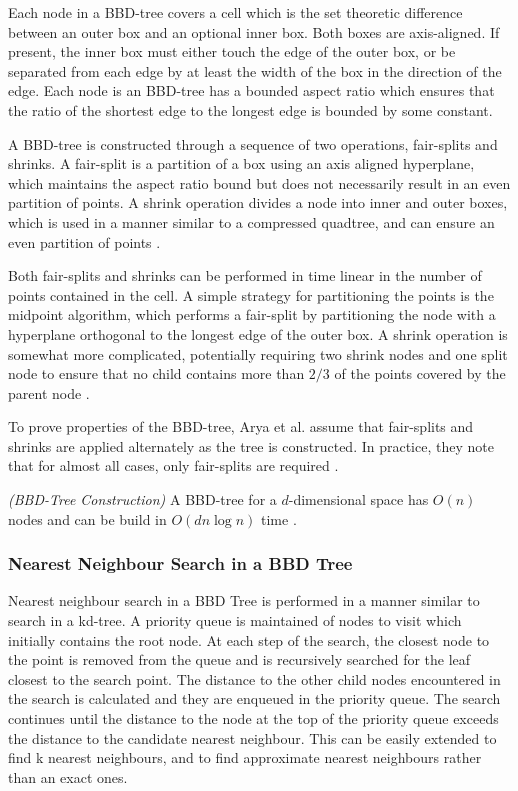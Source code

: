 \documentclass[mcs]{scsthesis}
\begin{document}
Each node in a BBD-tree covers a cell which is the set theoretic difference
between an outer box and an optional inner box. Both boxes are axis-aligned.
If present, the inner box must either touch the edge of the outer box, or be
separated from each edge by at least the width of the box in the direction of
the edge. Each node is an BBD-tree has a bounded aspect ratio which ensures
that the ratio of the shortest edge to the longest edge is bounded by some
constant.

A BBD-tree is constructed through a sequence of two operations, fair-splits
and shrinks. A fair-split is a partition of a box using an axis aligned
hyperplane, which maintains the aspect ratio bound but does not necessarily
result in an even partition of points. A shrink operation divides a node into
inner and outer boxes, which is used in a manner similar to a compressed
quadtree, and can ensure an even partition of points \cite{optimalann}.

Both fair-splits and shrinks can be performed in time linear in the number of
points contained in the cell. A simple strategy for partitioning the points is
the midpoint algorithm, which performs a fair-split by partitioning the node
with a hyperplane orthogonal to the longest edge of the outer box. A shrink
operation is somewhat more complicated, potentially requiring two shrink nodes
and one split node to ensure that no child contains more than \(2/3\) of the
points covered by the parent node \cite{optimalann}.

To prove properties of the BBD-tree, Arya et al. assume that fair-splits and
shrinks are applied alternately as the tree is constructed. In practice, they
note that for almost all cases, only fair-splits are required \cite{optimalann}. 

\begin{thm} \emph{(BBD-Tree Construction)} 
A BBD-tree for a \(d\)-dimensional space has \(O(n)\) nodes and can be build in
\(O(d n \log n)\) time \cite{optimalann}.
\end{thm}

\subsubsection{Nearest Neighbour Search in a BBD Tree}

Nearest neighbour search in a BBD Tree is performed in a manner similar to
search in a kd-tree. A priority queue is maintained of nodes to visit which
initially contains the root node. At each step of the search, the closest
node to the point is removed from the queue and is recursively searched for
the leaf closest to the search point. The distance to the other child nodes
encountered in the search is calculated and they are enqueued in the priority
queue. The search continues until the distance to the node at the top of the
priority queue exceeds the distance to the candidate nearest neighbour. This
can be easily extended to find k nearest neighbours, and to find approximate
nearest neighbours rather than an exact ones.
\end{document}
